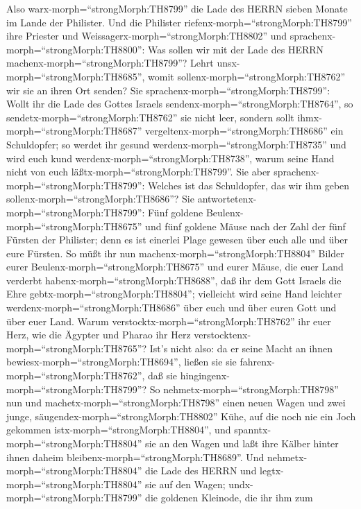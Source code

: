 Also warx-morph=``strongMorph:TH8799'' die Lade des HERRN
sieben Monate im Lande der Philister.  Und die Philister
riefenx-morph=``strongMorph:TH8799'' ihre Priester und
Weissagerx-morph=``strongMorph:TH8802'' und
sprachenx-morph=``strongMorph:TH8800'': Was sollen wir mit der Lade des
HERRN machenx-morph=``strongMorph:TH8799''? Lehrt
unsx-morph=``strongMorph:TH8685'', womit
sollenx-morph=``strongMorph:TH8762'' wir sie an ihren Ort senden?
 Sie sprachenx-morph=``strongMorph:TH8799'': Wollt ihr die
Lade des Gottes Israels sendenx-morph=``strongMorph:TH8764'', so
sendetx-morph=``strongMorph:TH8762'' sie nicht leer, sondern sollt
ihmx-morph=``strongMorph:TH8687''
vergeltenx-morph=``strongMorph:TH8686'' ein Schuldopfer; so werdet ihr
gesund werdenx-morph=``strongMorph:TH8735'' und wird euch kund
werdenx-morph=``strongMorph:TH8738'', warum seine Hand nicht von euch
läßtx-morph=``strongMorph:TH8799''.  Sie aber
sprachenx-morph=``strongMorph:TH8799'': Welches ist das Schuldopfer, das
wir ihm geben sollenx-morph=``strongMorph:TH8686''? Sie
antwortetenx-morph=``strongMorph:TH8799'': Fünf goldene
Beulenx-morph=``strongMorph:TH8675'' und fünf goldene Mäuse nach der
Zahl der fünf Fürsten der Philister; denn es ist einerlei Plage gewesen
über euch alle und über eure Fürsten.  So müßt ihr nun
machenx-morph=``strongMorph:TH8804'' Bilder eurer
Beulenx-morph=``strongMorph:TH8675'' und eurer Mäuse, die euer Land
verderbt habenx-morph=``strongMorph:TH8688'', daß ihr dem Gott Israels
die Ehre gebtx-morph=``strongMorph:TH8804''; vielleicht wird seine Hand
leichter werdenx-morph=``strongMorph:TH8686'' über euch und über euren
Gott und über euer Land.  Warum
verstocktx-morph=``strongMorph:TH8762'' ihr euer Herz, wie die Ägypter
und Pharao ihr Herz verstocktenx-morph=``strongMorph:TH8765''? Ist's
nicht also: da er seine Macht an ihnen
bewiesx-morph=``strongMorph:TH8694'', ließen sie sie
fahrenx-morph=``strongMorph:TH8762'', daß sie
hingingenx-morph=``strongMorph:TH8799''?  So
nehmetx-morph=``strongMorph:TH8798'' nun und
machetx-morph=``strongMorph:TH8798'' einen neuen Wagen und zwei junge,
säugendex-morph=``strongMorph:TH8802'' Kühe, auf die noch nie ein Joch
gekommen istx-morph=``strongMorph:TH8804'', und
spanntx-morph=``strongMorph:TH8804'' sie an den Wagen und laßt ihre
Kälber hinter ihnen daheim bleibenx-morph=``strongMorph:TH8689''.
 Und nehmetx-morph=``strongMorph:TH8804'' die Lade des HERRN
und legtx-morph=``strongMorph:TH8804'' sie auf den Wagen;
undx-morph=``strongMorph:TH8799'' die goldenen Kleinode, die ihr ihm zum
